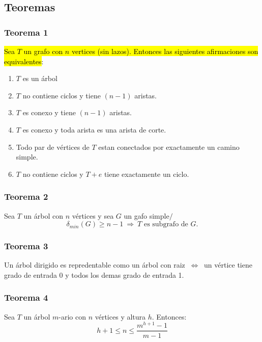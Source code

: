 \documentclass{article}
\newcommand{\tq}{/\,}                                   %
\newcommand{\Rightarrows}{\: \Rightarrow \:}            %
\newcommand{\Leftrightarrows}{\: \Leftrightarrow \:}    %
\begin{document}
\subsection{Teoremas}
\subsubsection{Teorema 1}
\hl{Sea $T$ un grafo con $n$ vertices (sin lazos). Entonces las siguientes afirmaciones son equivalentes}:
\begin{enumerate}
    \item $T$ es un árbol
    \item $T$ no contiene ciclos y tiene $(n-1)$ aristas.
    \item $T$ es conexo y tiene $(n-1)$ aristas.
    \item $T$ es conexo y toda arista es una arista de corte.
    \item Todo par de vértices de $T$ estan conectados por exactamente un camino simple.
    \item $T$ no contiene ciclos y $T + e$ tiene exactamente un ciclo.
\end{enumerate}

\subsubsection{Teorema 2}
Sea $T$ un árbol con $n$ vértices y sea $G$ un gafo simple$\tq$
\begin{equation*}
    \delta_{min}(G) \geq n-1 \Rightarrows T \text{ es subgrafo de } G.
\end{equation*}

\subsubsection{Teorema 3}
Un árbol dirigido es repredentable como un árbol con raiz $\Leftrightarrows$ un vértice tiene grado de entrada 
0 y todos los demas grado de entrada 1.

\subsubsection{Teorema 4}
Sea $T$ un árbol $m$-ario con $n$ vértices y altura $h$. Entonces:
\begin{equation*}
    h+1 \leq n \leq \frac{m^{h+1}-1}{m-1}
\end{equation*}
\end{document}
